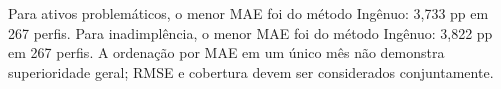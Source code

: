 Para ativos problemáticos, o menor MAE foi do método Ingênuo: 3,733 pp em 267 perfis. Para inadimplência, o menor MAE foi do método Ingênuo: 3,822 pp em 267 perfis. A ordenação por MAE em um único mês não demonstra superioridade geral; RMSE e cobertura devem ser considerados conjuntamente.